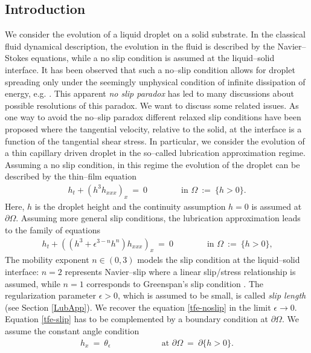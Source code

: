 \documentclass[pagesize,pdftex]{amsart}
\newcommand{\p}{\partial}
\newcommand{\eps}{\epsilon}
\newcommand{\ang}{\theta}
\newcommand{\Ome}{\Omega}
\begin{document}
\subsection{Introduction}

We consider the evolution of a liquid droplet on a solid substrate. In the
classical fluid dynamical description, the evolution in the fluid is described
by the Navier--Stokes equations, while a no slip condition is assumed at the
liquid--solid interface. It has been observed that such a no--slip condition
allows for droplet spreading only under the seemingly unphysical condition of
infinite dissipation of energy, e.g. \cite{HuhScriven-1971}. This apparent
\textit{no slip paradox} has led to many discussions about possible resolutions
of this paradox. We want to discuss some related issues. As one way to
avoid the no--slip paradox different relaxed slip conditions have been proposed
where the tangential velocity, relative to the solid, at the interface is a
function of the tangential shear stress. In particular, we consider the
evolution of a thin capillary driven droplet in the so--called lubrication
approximation regime. Assuming a no slip condition, in this regime the evolution
of the droplet can be described by the thin--film equation
\begin{align} \label{tfe-noslip} 
    h_t +(h^3 h_{xxx})_x \ = \ 0 \qquad\qquad %
  \text{in $\Ome \ := \ \{h>0\}$.}
\end{align}
Here, $h$ is the droplet height and the continuity assumption $h = 0$ is assumed
at $\p \Ome$.  Assuming more general slip conditions, the lubrication
approximation leads to the family of equations
\begin{align} \label{tfe-slip} 
  h_t +((h^3+ \eps^{3-n} h^{n})h_{xxx})_x \ = \ 0\qquad\qquad %
  \text{in $\Ome \ := \ \{h>0\}$,}
\end{align}
The mobility exponent $n \in (0,3)$ models the slip condition at the
liquid--solid interface: $n = 2$ represents Navier--slip where a linear
slip/stress relationship is assumed, while $n = 1$ corresponds to Greenspan's
slip condition \cite{Greenspan-1978}. The regularization parameter $\eps > 0$,
which is assumed to be small, is called \textit{slip length} (see Section
\ref{LubApp}). We recover the equation \eqref{tfe-noslip} in the limit
$\eps \to 0$. Equation \eqref{tfe-slip} has to be complemented by a boundary
condition at $\p \Ome$. We assume the constant angle condition
\begin{align} \label{tfe-bc} %
  h_x \ = \ \ang_\eps \qquad\qquad\qquad %
    \text{at $\p \Ome \ = \ \p\{h>0\}$.}
\end{align}
\end{document}
